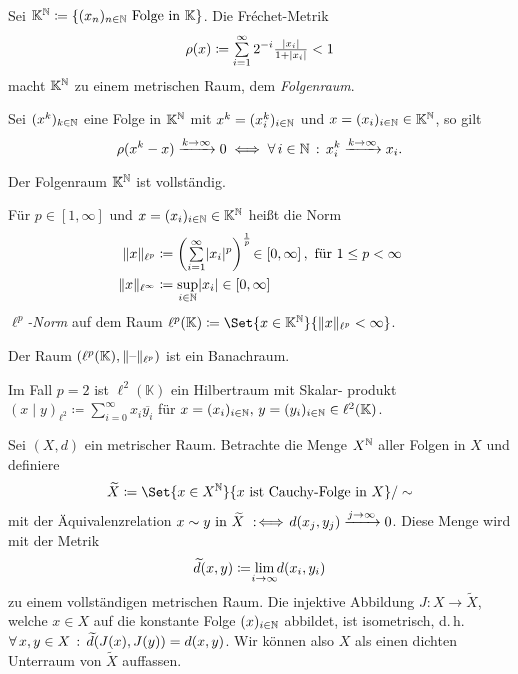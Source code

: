 \documentclass{cheat-sheet}
\newcommand{\K}{\mathbb{K}}
\newcommand{\scp}[2]{\left( #1 \!\mid\! #2 \right)} %
\newcommand{\convWith}[1]{\xrightarrow{#1 \to \infty}} %
\begin{document}
\begin{definition}
  Sei $\K^\N \coloneqq \{ (x_n)_{n \in \N} \text{ Folge in } \K \}$. Die Fréchet-Metrik
    \[ \rho(x) \coloneqq \sum_{i = 1}^\infty 2^{-i} \tfrac{ \abs{x_i} }{ 1 + \abs{x_i} } < 1 \]
  macht $\K^\N$ zu einem metrischen Raum, dem \emph{Folgenraum}.
\end{definition}

\begin{satz}
  Sei $(x^k)_{k \in \mathbb{N}}$ eine Folge in $\K^\N$ mit $x^k = (x^k_i)_{i \in \mathbb{N}}$ und $x = (x_i)_{i \in \N} \in \K^\N$, so gilt
  \[ \rho(x^k - x) \convWith{k} 0 \iff \fa{i \in \N} x_i^k \convWith{k} x_i. \]
\end{satz}

\begin{satz}
  Der Folgenraum $\K^\N$ ist vollständig.
\end{satz}

\begin{definition}
  Für $p \in \left[ 1, \infty \right]$ und $x = (x_i)_{i \in \N} \in \K^\N$ heißt die Norm
  \begin{align*}
    \norm{x}_{\ell^p} &\coloneqq \left( \sum_{i=1}^\infty \abs{x_i}^p \right)^{\frac{1}{p}} \!\in \left[ 0, \infty \right], \text{ für } 1 \leq p < \infty \\
    \norm{x}_{\ell^\infty} &\coloneqq \sup_{i \in \N} \abs{x_i} \in \left[0, \infty\right]
  \end{align*}
  \emph{$\ell^p$-Norm} auf dem Raum $\ell^p(\K) \coloneqq \Set{ x \in \K^\N }{ \norm{x}_{\ell^p} < \infty }$.
\end{definition}

\begin{satz}
  Der Raum $(\ell^p(\K), \norm{\blank}_{\ell^p})$ ist ein Banachraum.
\end{satz}

\begin{bem}
  Im Fall $p {=} 2$ ist $\ell^2(\K)$ ein Hilbertraum mit Skalar- produkt $\scp{x}{y}_{\ell^2} \coloneqq \sum_{i = 0}^\infty x_i \overline{y_i}$ für $x = (x_i)_{i \in \N}, \, y = (y_i)_{i \in \N} \in \ell^2(\K)$.
\end{bem}


\begin{satz}[Vervollständigung]
  Sei $(X, d)$ ein metrischer Raum. Betrachte die Menge $X^{\mathbb{N}}$ aller Folgen in $X$ und definiere
  \[ \widetilde{X} \coloneqq \Set{ x \in X^\N }{ x \text{ ist Cauchy-Folge in } X }/\sim \]
  mit der Äquivalenzrelation $x \sim y \text{ in } \widetilde{X} \!\coloniff\! d(x_j, y_j) \convWith{j} 0$.
  Diese Menge wird mit der Metrik
  \[ \widetilde{d}(x, y) \coloneqq \lim_{\mathclap{i \to \infty}} d(x_i, y_i) \]
  zu einem vollständigen metrischen Raum. Die injektive Abbildung $J : X \to \tilde{X}$, welche $x \in X$ auf die konstante Folge $(x)_{i \in \mathbb{N}}$ abbildet, ist isometrisch, d.\,h.
  $\forall \, {x, y \in X} \,:\, \widetilde{d}(J(x), J(y)) = d(x, y)$.
  Wir können also $X$ als einen dichten Unterraum von $\widetilde{X}$ auffassen.
\end{satz}
\end{document}

